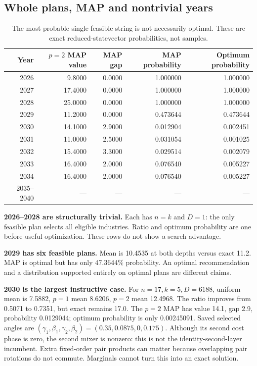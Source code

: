 \documentclass[11pt,letterpaper]{article}
\begin{document}
\subsection{Whole plans, MAP and nontrivial years}\label{sec:targetmap}
\begin{table}[H]\centering
\begin{tabular}{@{}rrrrr@{}}\toprule
Year & $p=2$ MAP value & MAP gap & MAP probability & Optimum probability\\\midrule
2026 & 9.8000 & 0.0000 & 1.000000 & 1.000000 \\
2027 & 17.4000 & 0.0000 & 1.000000 & 1.000000 \\
2028 & 25.0000 & 0.0000 & 1.000000 & 1.000000 \\
2029 & 11.2000 & 0.0000 & 0.473644 & 0.473644 \\
2030 & 14.1000 & 2.9000 & 0.012904 & 0.002451 \\
2031 & 11.0000 & 2.5000 & 0.031054 & 0.001025 \\
2032 & 15.4000 & 3.3000 & 0.029514 & 0.002079 \\
2033 & 16.4000 & 2.0000 & 0.076540 & 0.005227 \\
2034 & 16.4000 & 2.0000 & 0.076540 & 0.005227 \\
2035--2040 & --- & --- & --- & --- \\
\bottomrule\end{tabular}
\caption{The most probable single feasible string is not necessarily optimal. These are exact reduced-statevector probabilities, not samples.}
\end{table}

\textbf{2026--2028 are structurally trivial.} Each has $n=k$ and $D=1$: the only feasible plan selects all eligible industries. Ratio and optimum probability are one before useful optimization. These rows do not show a search advantage.

\textbf{2029 has six feasible plans.} Mean is 10.4535 at both depths versus exact 11.2. MAP is optimal but has only 47.3644\% probability. An optimal recommendation and a distribution supported entirely on optimal plans are different claims.

\textbf{2030 is the largest instructive case.} For $n=17,k=5,D=6188$, uniform mean is 7.5882, $p=1$ mean 8.6206, $p=2$ mean 12.4968. The ratio improves from 0.5071 to 0.7351, but exact remains 17.0. The $p=2$ MAP has value 14.1, gap 2.9, probability 0.0129044; optimum probability is only 0.00245091. Saved selected angles are $(\gamma_1,\beta_1,\gamma_2,\beta_2)=(0.35,0.0875,0,0.175)$. Although its second cost phase is zero, the second mixer is nonzero: this is not the identity-second-layer incumbent. Extra fixed-order pair products can matter because overlapping pair rotations do not commute. Marginals cannot turn this into an exact solution.
\end{document}
